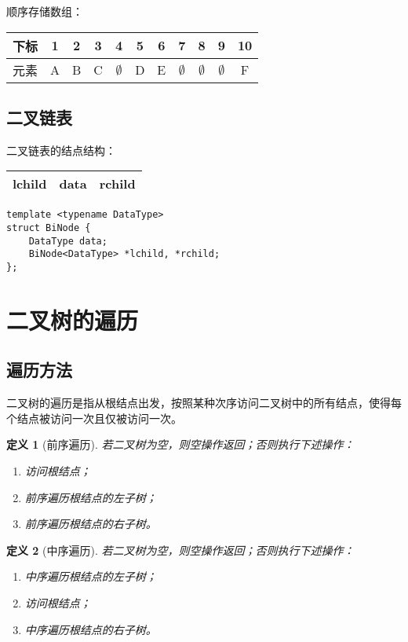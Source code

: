 \documentclass[12pt,a4paper]{amsart}
\newtheorem{definition}{定义}[section]
\begin{document}
顺序存储数组：
\begin{center}
\begin{tabular}{|c|c|c|c|c|c|c|c|c|c|c|}
\hline
下标 & 1 & 2 & 3 & 4 & 5 & 6 & 7 & 8 & 9 & 10 \\
\hline
元素 & A & B & C & $\emptyset$ & D & E & $\emptyset$ & $\emptyset$ & $\emptyset$ & F \\
\hline
\end{tabular}
\end{center}

\subsection{二叉链表}

二叉链表的结点结构：
\begin{center}
\begin{tabular}{|c|c|c|}
\hline
lchild & data & rchild \\
\hline
\end{tabular}
\end{center}

\begin{lstlisting}[caption=二叉链表结点定义]
template <typename DataType>
struct BiNode {
    DataType data;
    BiNode<DataType> *lchild, *rchild;
};
\end{lstlisting}

\section{二叉树的遍历}

\subsection{遍历方法}

二叉树的遍历是指从根结点出发，按照某种次序访问二叉树中的所有结点，使得每个结点被访问一次且仅被访问一次。

\begin{definition}[前序遍历]
若二叉树为空，则空操作返回；否则执行下述操作：
\begin{enumerate}
\item 访问根结点；
\item 前序遍历根结点的左子树；
\item 前序遍历根结点的右子树。
\end{enumerate}
\end{definition}

\begin{definition}[中序遍历]
若二叉树为空，则空操作返回；否则执行下述操作：
\begin{enumerate}
\item 中序遍历根结点的左子树；
\item 访问根结点；
\item 中序遍历根结点的右子树。
\end{enumerate}
\end{definition}
\end{document}
